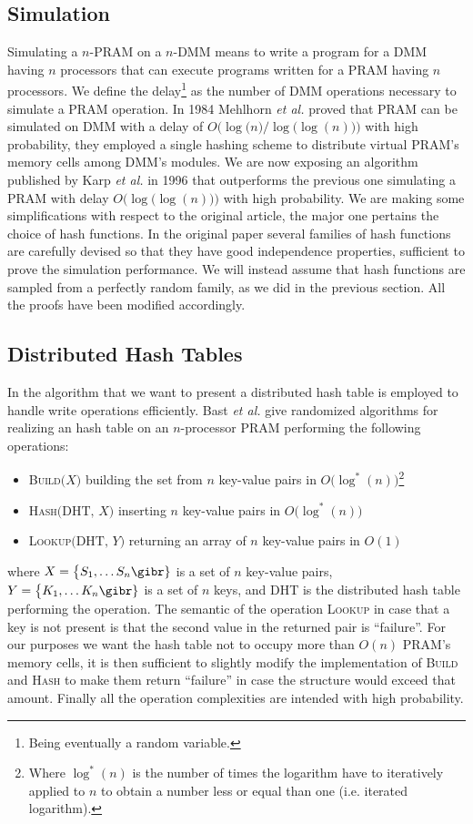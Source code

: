 \subsection{Simulation}
Simulating a $n$-PRAM on a $n$-DMM means to write a program for a DMM having
$n$ processors that can execute programs written for a PRAM having
$n$ processors. We define the delay\footnote{Being eventually
  a random variable.} as the number of DMM operations necessary to simulate
a PRAM operation. In 1984 Mehlhorn {\em et al.} \cite{art} proved that PRAM
can be simulated on DMM with a delay of $O\bigl(\log\bigl(n\bigr)\bigr / \log\bigl(\log(n)\bigr))$
with high probability, they employed a single hashing scheme to
distribute virtual PRAM's
 memory cells among DMM's modules. 
We are now exposing an algorithm published by Karp {\em et al.} \cite{Karp} in
1996 that
outperforms the previous one simulating a PRAM with delay
$O\bigl(\log\bigl(\log(n)\bigr)\bigr)$ with high probability.
We are making some simplifications with respect to the original article,
the major one pertains the choice of hash functions.
In the original paper several families of hash
functions are carefully
devised so that they have good independence properties,
sufficient to prove the simulation 
performance. We will instead assume that hash functions are sampled from
a perfectly random family, as we did in the previous section. All the proofs
have been modified accordingly.

\subsection{Distributed Hash Tables}
In the algorithm that we want to present a distributed hash
table is employed to handle write operations efficiently.
Bast {\em et al.} \cite{Bast}
give randomized algorithms for realizing an hash table on an $n$-processor PRAM
performing the following operations:
\begin{itemize}
\item \textsc{Build}$\bigl(X\bigr)$ building the set from $n$ key-value
  pairs in $O\bigl(\log^*(n)\bigr)$\footnote{Where $\log^*(n)$ is the number of
    times the logarithm have to iteratively applied to $n$ to obtain a number
    less or equal than one (i.e. iterated logarithm).}
\item \textsc{Hash}$\bigl(\text{DHT, }X\bigr)$ inserting $n$ key-value pairs in  
  $O\bigl(\log^*(n)\bigr)$
\item \textsc{Lookup}$\bigl(\text{DHT, }Y\bigr)$ returning an array of $n$ key-value pairs in $O(1)$
\end{itemize}
where $X = \bigl\{S_1, \dots S_n\gibr\}$ is a set of $n$ key-value pairs,
$Y = \bigl\{K_1, \dots K_n\gibr\}$ is a set of $n$ keys, and DHT is the
distributed hash table performing the operation.
The semantic of the operation \textsc{Lookup} in case that a key is not present is that
the second value in the returned pair is ``failure''. For our purposes we want
the hash table not to occupy more than $O(n)$ PRAM's memory cells, it is
then sufficient to slightly modify the implementation of \textsc{Build} and
\textsc{Hash}
to make them return ``failure'' in case the structure would exceed that amount.
Finally all the operation complexities are intended with high probability.

